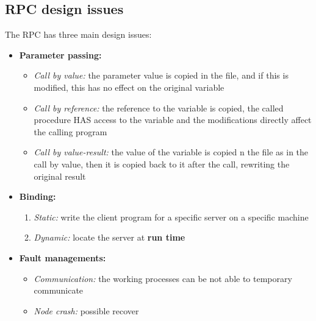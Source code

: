 \subsection{RPC design issues}
The RPC has three main design issues:
\begin{itemize}
    \item \textbf{Parameter passing:}
        \begin{itemize}
            \item \textit{Call by value:} the parameter value is copied in the file, and if this is modified, this has no effect on the original variable
            \item \textit{Call by reference:} the reference to the variable is copied, the called procedure HAS access to the variable and the modifications directly affect the calling program
            \item \textit{Call by value-result:} the value of the variable is copied n the file as in the call by value, then it is copied back to it after the call, rewriting the original result
        \end{itemize}
    \item \textbf{Binding:}
        \begin{enumerate}
            \item \textit{Static:} write the client program for a specific server on a specific machine
            \item \textit{Dynamic:} locate the server at \textbf{run time}
        \end{enumerate}
    \item \textbf{Fault managements:}
        \begin{itemize}
            \item \textit{Communication:} the working processes can be not able to temporary communicate
            \item \textit{Node crash:} possible recover
        \end{itemize}
\end{itemize}
 

